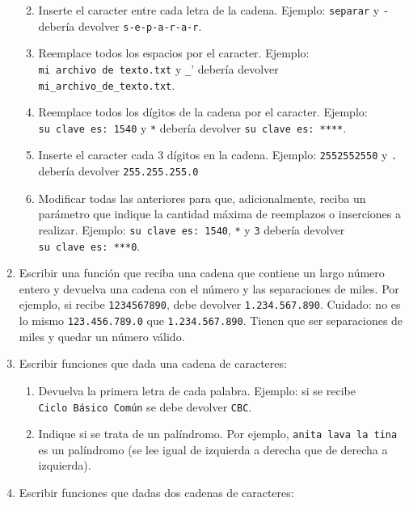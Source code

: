 \documentclass[
  letterpaper,
  DIV=11,
  numbers=noendperiod]{scrreprt}
\providecommand{\tightlist}{%
  \setlength{\itemsep}{0pt}\setlength{\parskip}{0pt}}\usepackage{longtable,booktabs,array}
\begin{document}
\begin{enumerate}
  \begin{enumerate}
  \def\labelenumii{\alph{enumii}.}
  \item
    Inserte el caracter entre cada letra de la cadena. Ejemplo:
    \texttt{\textquotesingle{}separar\textquotesingle{}} y
    \texttt{\textquotesingle{}-\textquotesingle{}} debería devolver
    \texttt{\textquotesingle{}s-e-p-a-r-a-r\textquotesingle{}}.\\
  \item
    Reemplace todos los espacios por el caracter. Ejemplo:
    \texttt{\textquotesingle{}mi\ archivo\ de\ texto.txt\textquotesingle{}}
    y \texttt{\textquotesingle{}\_}' debería devolver
    \texttt{\textquotesingle{}mi\_archivo\_de\_texto.txt\textquotesingle{}}.\\
  \item
    Reemplace todos los dígitos de la cadena por el caracter. Ejemplo:
    \texttt{\textquotesingle{}su\ clave\ es:\ 1540\textquotesingle{}} y
    \texttt{\textquotesingle{}*\textquotesingle{}} debería devolver
    \texttt{\textquotesingle{}su\ clave\ es:\ ****\textquotesingle{}}.\\
  \item
    Inserte el caracter cada 3 dígitos en la cadena. Ejemplo:
    \texttt{\textquotesingle{}2552552550\textquotesingle{}} y
    \texttt{\textquotesingle{}.\textquotesingle{}} debería devolver
    \texttt{\textquotesingle{}255.255.255.0\textquotesingle{}}
  \item
    Modificar todas las anteriores para que, adicionalmente, reciba un
    parámetro que indique la cantidad máxima de reemplazos o inserciones
    a realizar. Ejemplo:
    \texttt{\textquotesingle{}su\ clave\ es:\ 1540\textquotesingle{}},
    \texttt{\textquotesingle{}*\textquotesingle{}} y \texttt{3} debería
    devolver
    \texttt{\textquotesingle{}su\ clave\ es:\ ***0\textquotesingle{}}.
  \end{enumerate}
\item
  Escribir una función que reciba una cadena que contiene un largo
  número entero y devuelva una cadena con el número y las separaciones
  de miles. Por ejemplo, si recibe \texttt{1234567890}, debe devolver
  \texttt{1.234.567.890}. Cuidado: no es lo mismo \texttt{123.456.789.0}
  que \texttt{1.234.567.890}. Tienen que ser separaciones de miles y
  quedar un número válido.
\item
  Escribir funciones que dada una cadena de caracteres:

  \begin{enumerate}
  \def\labelenumii{\alph{enumii}.}
  \tightlist
  \item
    Devuelva la primera letra de cada palabra. Ejemplo: si se recibe
    \texttt{Ciclo\ Básico\ Común} se debe devolver \texttt{CBC}.
  \item
    Indique si se trata de un palíndromo. Por ejemplo,
    \texttt{anita\ lava\ la\ tina} es un palíndromo (se lee igual de
    izquierda a derecha que de derecha a izquierda).
  \end{enumerate}
\item
  Escribir funciones que dadas dos cadenas de caracteres:


\end{enumerate}
\end{document}

